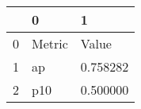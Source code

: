 \begin{tabular}{lll}
\toprule
 & 0 & 1 \\
\midrule
0 & Metric & Value \\
1 & ap & 0.758282 \\
2 & p10 & 0.500000 \\
\bottomrule
\end{tabular}
